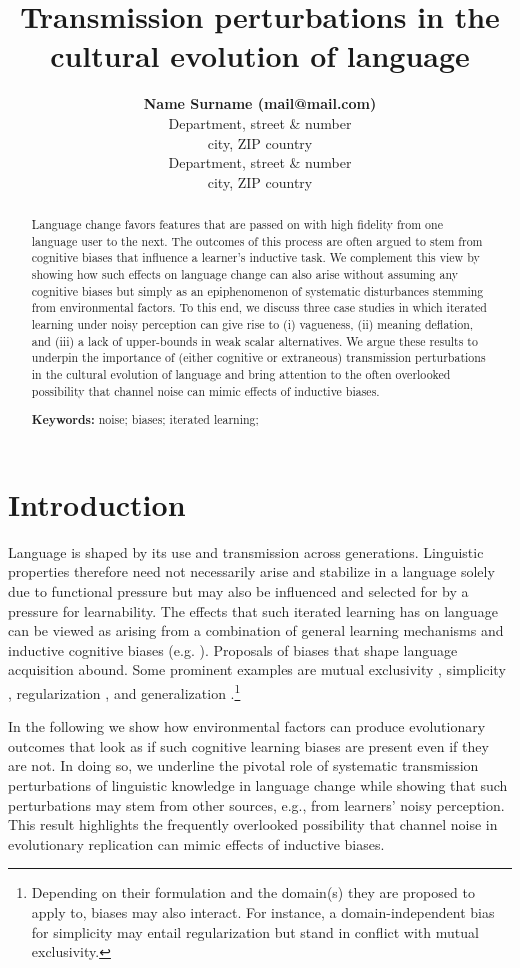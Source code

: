 \documentclass[10pt,a4paper]{article}
\title{Transmission perturbations in the cultural evolution of language}
\author{{\large \bf Name Surname (mail@mail.com)} \\
  Department, street \& number \\
  city, ZIP country
  \AND {\large \bf Name Surname (mail@mail.com)} \\
  Department, street \& number \\
  city, ZIP country}
\begin{document}
\maketitle

\begin{abstract}
Language change favors features that are passed on with high fidelity from one language user to the next. The outcomes of this process are often argued to stem from cognitive biases that influence a learner's inductive task. We complement this view by showing how such effects on language change can also arise without assuming any cognitive biases but simply as an epiphenomenon of systematic disturbances stemming from environmental factors. To this end, we discuss three case studies in which iterated learning under noisy perception can give rise to (i) vagueness, (ii) meaning deflation, and (iii) a lack of upper-bounds in weak scalar alternatives. We argue these results to underpin the importance of (either cognitive or extraneous) transmission perturbations in the cultural evolution of language and bring attention to the often overlooked possibility that channel noise can mimic effects of inductive biases.

\textbf{Keywords:} 
noise; biases; iterated learning;   
\end{abstract}
\section{Introduction}
Language is shaped by its use and transmission across generations. Linguistic properties therefore need not necessarily arise and stabilize in a language solely due to functional pressure but may also be influenced and selected for by a pressure for learnability. The effects that such iterated learning has on language can be viewed as arising from a combination of general learning mechanisms and inductive cognitive biases (e.g. \citealt{griffiths+kalish:2007,kirby+etal:2014,tamariz+kirby:2016}). Proposals of biases that shape language acquisition abound. Some prominent examples are mutual exclusivity \citep{merriman+bowman:1989,clark:2009}, simplicity \citep{kirby+etal:2015}, regularization \citep{hudson+etal:2005}, and generalization \citep{smith:2011,oconnor:2015}.\footnote{Depending on their formulation and the domain(s) they are proposed to apply to, biases may also interact. For instance, a domain-independent bias for simplicity may entail regularization but stand in conflict with mutual exclusivity.} 

In the following we show how environmental factors can produce evolutionary outcomes that look as if such cognitive learning biases are present even if they are not. In doing so, we underline the pivotal role of systematic transmission perturbations of linguistic knowledge in language change while showing that such perturbations may stem from other sources, e.g., from learners' noisy perception. This result highlights the frequently overlooked possibility that channel noise in evolutionary replication can mimic effects of inductive biases.
\end{document}
